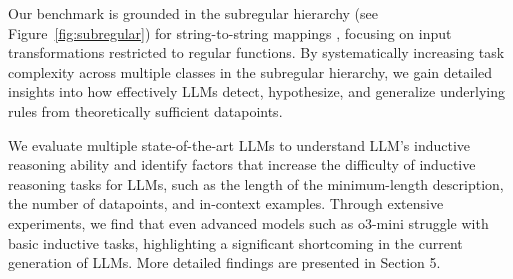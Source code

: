 Our benchmark is grounded in the subregular hierarchy \citep{rogers2011aural, truthe2018hierarchy, graf2022diving, jager2012formal, heinz2018computational} (see Figure~\ref{fig:subregular}) for string-to-string mappings \citep{mohri1997finite}, focusing on input transformations restricted to regular functions. By systematically increasing task complexity across multiple classes in the subregular hierarchy, we gain detailed insights into how effectively LLMs detect, hypothesize, and generalize underlying rules from theoretically sufficient datapoints. 

We evaluate multiple state-of-the-art LLMs to understand LLM's inductive reasoning ability and identify factors that increase the difficulty of inductive reasoning tasks for LLMs, such as the length of the minimum-length description, the number of datapoints, and in-context examples. Through extensive experiments, we find that even advanced models such as o3-mini struggle with basic inductive tasks, highlighting a significant shortcoming in the current generation of LLMs. More detailed findings are presented in Section 5.

